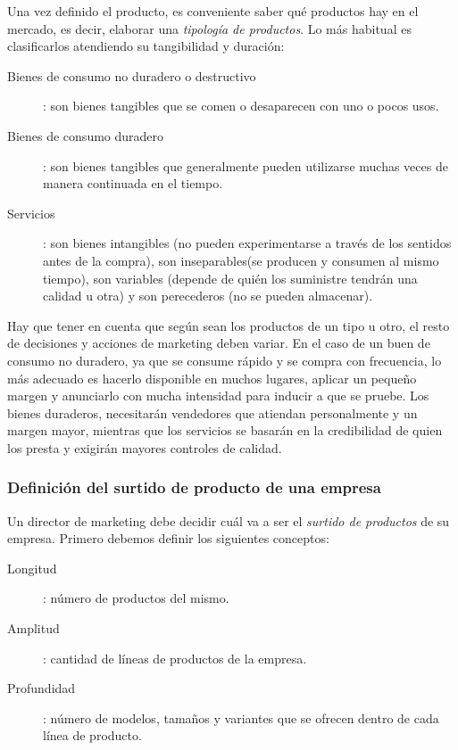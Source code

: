 \documentclass[10pt,a4paper,spanish]{report}
\begin{document}
			Una vez definido el producto, es conveniente saber qué productos hay en el mercado, es decir, elaborar una \textit{\textcolor[rgb]{0.1,0.2,0.4}{tipología de productos}}. Lo más habitual es clasificarlos atendiendo su tangibilidad y duración:
			\begin{description}
				\item[Bienes de consumo no duradero o destructivo]: son bienes tangibles que se comen o desaparecen con uno o pocos usos.

				\item[Bienes de consumo duradero]: son bienes tangibles que generalmente pueden utilizarse muchas veces de manera continuada en el tiempo.

				\item[Servicios]: son bienes intangibles (no pueden experimentarse a través de los sentidos antes de la compra), son inseparables(se producen y consumen al mismo tiempo), son variables (depende de quién los suministre tendrán una calidad u otra) y son perecederos (no se pueden almacenar).
			\end{description}

			Hay que tener en cuenta que según sean los productos de un tipo u otro, el resto de decisiones y acciones de marketing deben variar. En el caso de un buen de consumo no duradero, ya que se consume rápido y se compra con frecuencia, lo más adecuado es hacerlo disponible en muchos lugares, aplicar un pequeño margen y anunciarlo con mucha intensidad para inducir a que se pruebe. Los bienes duraderos, necesitarán vendedores que atiendan personalmente y un margen mayor, mientras que los servicios se basarán en la credibilidad de quien los presta y exigirán mayores controles de calidad.

		\subsubsection{\textcolor[rgb]{0.1,0.2,0.4}Definición del surtido de producto de una empresa}

			Un director de marketing debe decidir cuál va a ser el \textit{\textcolor[rgb]{0.1,0.2,0.4}{surtido de productos}} de su empresa. Primero debemos definir los siguientes conceptos:
			\begin{description}
				\item[Longitud]: número de productos del mismo.
				\item[Amplitud]: cantidad de líneas de productos de la empresa.
				\item[Profundidad]: número de modelos, tamaños y variantes que se ofrecen dentro de cada línea de producto.
			\end{description}
\end{document}
